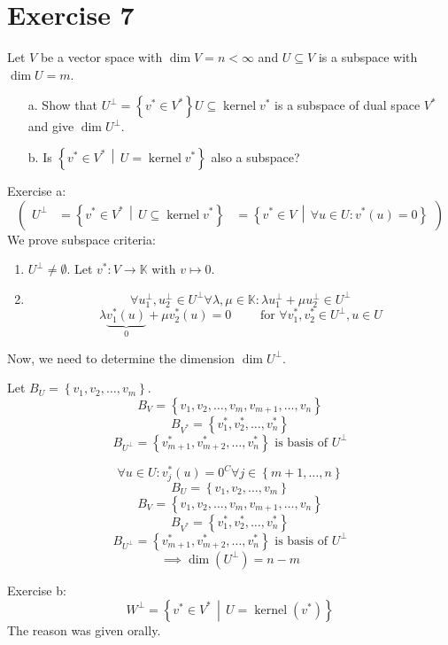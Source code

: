 \documentclass[a4paper]{article}
\theoremstyle{definition}
\DeclareMathOperator\kernel{kernel}
\newcommand\set[1]{\left\{#1\right\}}
\newcommand\setdef[2]{\left\{#1\,\middle|\,#2\right\}}
\begin{document}
\section*{Exercise 7}
\begin{ex}
  Let $V$ be a vector space with $\dim{V} = n < \infty$
  and $U \subseteq V$ is a subspace with $\dim{U} = m$.
  \begin{enumerate}
    \item[a.] Show that $U^\bot = \set{v^* \in V^*}{U \subseteq \kernel{v^*}}$ is a subspace of dual space $V^*$ and give $\dim{U^{\bot}}$.
    \item[b.] Is $\setdef{v^* \in V^*}{U = \kernel{v^*}}$ also a subspace?
  \end{enumerate}
\end{ex}

Exercise a:
\[
  \begin{pmatrix}
    U^\bot &= \setdef{v^* \in V^*}{U \subseteq \kernel{v^*}}
           &= \setdef{v^* \in V}{\forall u \in U: v^*(u) = 0}
  \end{pmatrix}
\]
We prove subspace criteria:
\begin{enumerate}
  \item $U^\bot \neq \emptyset$. Let $v^*: V \to \mathbb K$ with $v \mapsto 0$.
  \item
    \[ \forall u^\bot_1, u^\bot_2 \in U^\bot \forall \lambda, \mu \in \mathbb K: \lambda u_1^\bot + \mu u_2^\bot \in U^\bot \]
    \[ \lambda \underbrace{v_1^*(u)}_{0} + \mu v_2^*(u) = 0  \qquad \text{ for } \forall v_1^*, v_2^* \in U^\bot, u \in U \]
\end{enumerate}

Now, we need to determine the dimension $\dim{U^{\bot}}$.

Let $B_U = \set{v_1, v_2, \dots, v_m}$.
\[ B_V = \set{v_1, v_2, \dots, v_m, v_{m+1}, \dots, v_n} \]
\[ B_{V^*} = \set{v_1^*, v_2^*, \dots, v_n^*} \]
\[ B_{U^{\bot}} = \set{v_{m+1}^*, v_{m+2}^*, \dots, v_n^*} \text{ is basis of } U^\bot \]

\[ \forall u \in U: v^*_j(u) = 0^C \forall j \in \set{m+1, \dots, n} \]
\[ B_U = \set{v_1, v_2, \dots, v_m} \]
\[ B_V = \set{v_1, v_2, \dots, v_m, v_{m+1}, \dots, v_n} \]
\[ B_{V^*} = \set{v_1^*, v_2^*, \dots, v_n^*} \]
\[ B_{U^\bot} = \set{v_{m+1}^*, v_{m+2}^*, \dots, v_n^*} \text{ is basis of } U^\bot \]
\[ \implies \dim(U^\bot) = n - m \]

Exercise b:
\[ W^\bot = \setdef{v^* \in V^*}{U = \kernel(v^*)} \]
The reason was given orally.
\end{document}
